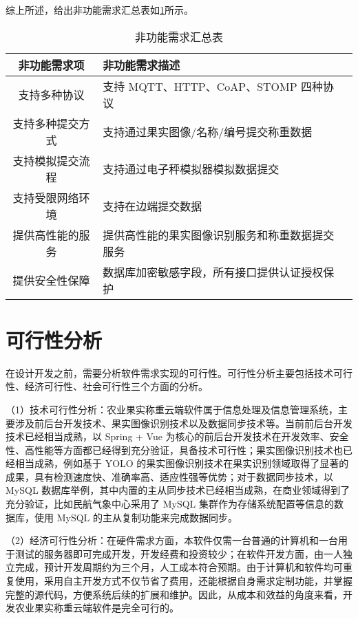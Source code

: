综上所述，给出非功能需求汇总表如\ref{tab:n-req-summary}所示。

\begin{longtable}[ht]{|c|p{8cm}|c|}
\caption{非功能需求汇总表}
\label{tab:n-req-summary}
\\
\hline
非功能需求项 & 非功能需求描述 \\\hline
支持多种协议 & 支持 MQTT、HTTP、CoAP、STOMP 四种协议 \\\hline
支持多种提交方式 & 支持通过果实图像/名称/编号提交称重数据 \\\hline
支持模拟提交流程 & 支持通过电子秤模拟器模拟数据提交 \\\hline
支持受限网络环境 & 支持在边端提交数据 \\\hline
提供高性能的服务 & 提供高性能的果实图像识别服务和称重数据提交服务 \\\hline
提供安全性保障 & 数据库加密敏感字段，所有接口提供认证授权保护 \\\hline
\end{longtable}

\section{可行性分析}\label{sec:req3}

在设计开发之前，需要分析软件需求实现的可行性。可行性分析主要包括技术可行性、经济可行性、社会可行性三个方面的分析\cite{叶俊民2006软件工程}。

（1）技术可行性分析：农业果实称重云端软件属于信息处理及信息管理系统，主要涉及前后台开发技术、果实图像识别技术以及数据同步技术等。当前前后台开发技术已经相当成熟，以 Spring + Vue 为核心的前后台开发技术在开发效率、安全性、高性能等方面都已经得到充分验证\cite{Qiu2021}\cite{Shan2021}，具备技术可行性；果实图像识别技术也已经相当成熟，例如基于 YOLO 的果实图像识别技术在果实识别领域取得了显著的成果，具有检测速度快、准确率高、适应性强等优势\cite{Lin2019}；对于数据同步技术，以 MySQL 数据库举例，其中内置的主从同步技术已经相当成熟，在商业领域得到了充分验证，比如民航气象中心采用了 MySQL 集群作为存储系统配置等信息的数据库，使用 MySQL 的主从复制功能来完成数据同步\cite{厍雯轩-2024}。

（2）经济可行性分析：在硬件需求方面，本软件仅需一台普通的计算机和一台用于测试的服务器即可完成开发，开发经费和投资较少；在软件开发方面，由一人独立完成，预计开发周期约为三个月，人工成本符合预期。由于计算机和软件均可重复使用，采用自主开发方式不仅节省了费用，还能根据自身需求定制功能，并掌握完整的源代码，方便系统后续的扩展和维护。因此，从成本和效益的角度来看，开发农业果实称重云端软件是完全可行的。

